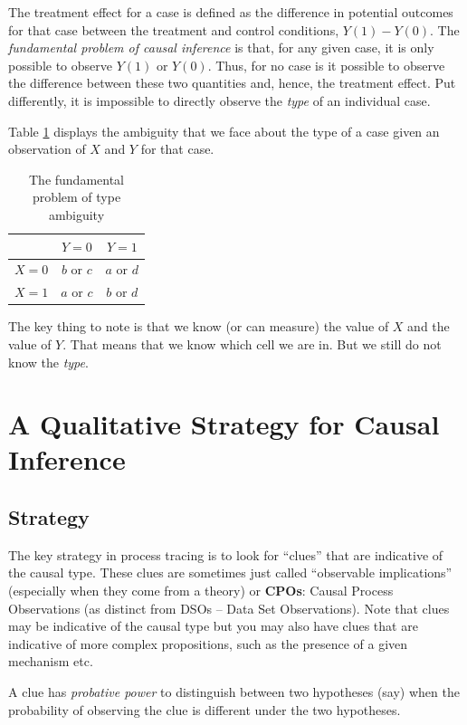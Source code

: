 \documentclass[11pt]{article}
\begin{document}
The treatment effect for a case is defined as the difference in potential outcomes for that case between the treatment and control conditions, $Y(1)-Y(0)$. The \textit{fundamental problem of causal inference} is that, for any given case, it is only possible to observe $Y(1)$ or $Y(0)$. Thus, for no case is it possible to observe the difference between these two quantities and, hence, the treatment effect. Put differently, it is impossible to directly observe the \textit{type} of an individual case. 

Table \ref{FP} displays the ambiguity that we face about the type of a case given an observation of $X$ and $Y$ for that case.

\begin{table}[h!]
\centering
\begin{tabular}{c|cc}
           &        $Y=0$ &        $Y=1$ \\ \hline
       $X=0$ &     $b$ or $c$ &     $a$ or $d$ \\
       $X=1$ &     $a$ or $c$ &     $b$ or $d$ \\
\end{tabular}  
\caption{The fundamental problem of type ambiguity}
\label{FP} 
\end{table}


The key thing to note is that we know (or can measure) the value of $X$ and the value of $Y$. That means that we know which cell we are in. But we still do not know the \textit{type}. 


\section{A Qualitative Strategy for Causal Inference}
\subsection{Strategy}
The key strategy in process tracing is to look for ``clues'' that are indicative of the causal type. These clues are sometimes just called ``observable implications'' (especially when they come from a theory) or \textbf{CPOs}: Causal Process Observations (as distinct from DSOs -- Data Set Observations). Note that clues may be indicative of the causal type but you may also have clues that are indicative of more complex propositions, such as the presence of a given mechanism etc.

A clue has \textit{probative power} to distinguish between two hypotheses (say) when the probability of observing the clue is different under the two hypotheses.
\end{document}
